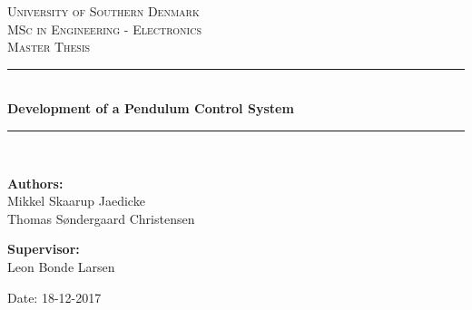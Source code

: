 \begin{titlepage}
\begin{center}

\textsc{\LARGE University of Southern Denmark}\\[1.5cm]
\textsc{\Large MSc in Engineering - Electronics}\\
\textsc{\large Master Thesis}\\[0.5cm]

\vfill
\vspace{3cm}
\hrule ~\\[0.3cm]
{ \LARGE \bfseries Development of a Pendulum Control System\\[0.4cm] }
\hrule ~\\[1.5cm]

\vfill

\vspace{5cm}
\begin{minipage}[t]{.55\textwidth}
\begin{flushleft} \large
\textbf{Authors:}\\
Mikkel Skaarup Jaedicke\\
Thomas Søndergaard Christensen
\end{flushleft}
\end{minipage}
\begin{minipage}[t]{.44\textwidth}
\begin{flushright} \large
\textbf{Supervisor:} \\
Leon Bonde Larsen
\end{flushright}
\end{minipage}

\vspace{1cm}
Date: 18-12-2017

\vspace{1cm}

\end{center}
\end{titlepage}